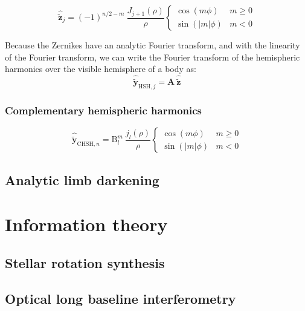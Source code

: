\documentclass[modern]{aastex631}
\begin{document}
\begin{equation} \label{eq:zernike_ft}
 \widehat{\mathbf{\tilde{z}}}_j = (-1)^{n/2-m}\ \frac{J_{j+1}(\rho)}{\rho} \left\{
    \begin{array}{ll}
    \cos(m \phi) &  m \geq 0 \\
    \sin(|m| \phi) &  m < 0
    \end{array}
    \right.
\end{equation}

Because the Zernikes have an analytic Fourier transform, and with the linearity of the Fourier transform, we can write the Fourier transform of the hemispheric harmonics over the visible hemisphere of a body as:
\begin{equation} \label{eq:hsh_to_zern}
  \widehat{\mathbf{\tilde{y}}}_{\mathrm{HSH}, j} = \mathbf{A} \ \widehat{\mathbf{\tilde{z}}}
\end{equation}

\subsubsection{Complementary hemispheric harmonics}

\begin{equation} \label{eq:cshs_ft}
\widehat{\mathbf{\tilde{y}}}_{\mathrm{CHSH}, n} = \mathrm{B}_l^m \  \frac{j_l(\rho)}{\rho} \left\{
\begin{array}{ll}
\cos(m \phi) &  m \geq 0 \\
\sin(|m| \phi) &  m < 0
\end{array}
\right.
\end{equation}

\subsection{Analytic limb darkening}

\section{Information theory}
\label{sec:infotheory}
\subsection{Stellar rotation synthesis}

\subsection{Optical long baseline interferometry}
\end{document}
